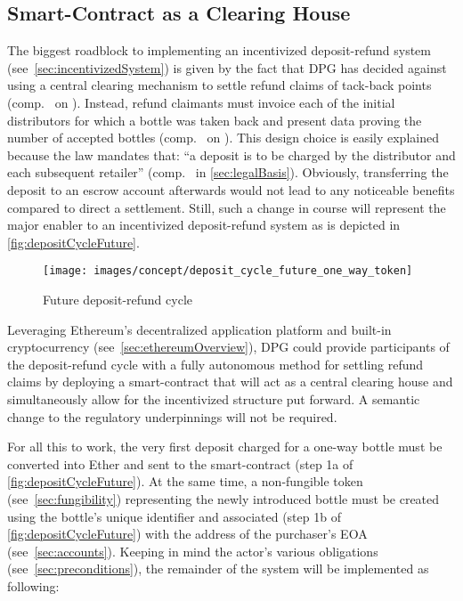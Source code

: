 \subsection{Smart-Contract as a Clearing House}
The biggest roadblock to implementing an incentivized deposit-refund system (see~\ref{sec:incentivizedSystem}) is given by the fact that \ac{DPG} has decided against using a central clearing mechanism to settle refund claims of tack-back points (comp.~ on ). Instead, refund claimants must invoice each of the initial distributors for which a bottle was taken back and present data proving the number of accepted bottles (comp.~ on ). This design choice is easily explained because the law mandates that: \enquote{a deposit is to be charged by the distributor and each subsequent retailer} (comp.~ in \ref{sec:legalBasis}). Obviously, transferring the deposit to an escrow account afterwards would not lead to any noticeable benefits compared to direct a settlement. Still, such a change in course will represent the major enabler to an incentivized deposit-refund system as is depicted in \autoref{fig:depositCycleFuture}.

\begin{figure}[hbt]
	  \texttt{[image: images/concept/deposit\_cycle\_future\_one\_way\_token]}
	  \caption[Future deposit-refund cycle]{Future deposit-refund cycle \footnotemark}
	  \label{fig:depositCycleFuture}
\end{figure}


\FloatBarrier

Leveraging Ethereum's decentralized application platform and built-in cryptocurrency (see~\ref{sec:ethereumOverview}), \ac{DPG} could provide participants of the deposit-refund cycle with a fully autonomous method for settling refund claims by deploying a smart-contract that will act as a central clearing house and simultaneously allow for the incentivized structure put forward. A semantic change to the regulatory underpinnings will not be required. 

For all this to work, the very first deposit charged for a one-way bottle must be converted into Ether and sent to the smart-contract (step 1a of \autoref{fig:depositCycleFuture}). At the same time, a non-fungible token (see~\ref{sec:fungibility}) representing the newly introduced bottle must be created using the bottle's unique identifier and associated (step 1b of \autoref{fig:depositCycleFuture}) with the address of the purchaser's \ac{EOA} (see~\ref{sec:accounts}). Keeping in mind the actor's various obligations (see~\ref{sec:preconditions}), the remainder of the system will be implemented as following: 

